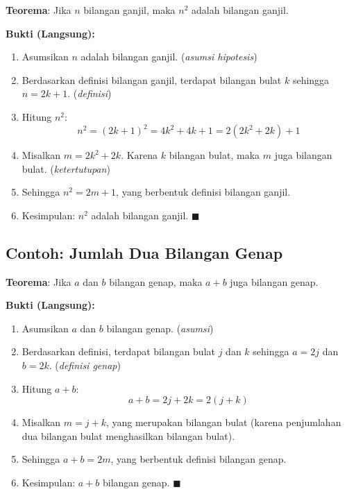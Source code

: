 \begin{contoh}
\textbf{Teorema}: Jika $n$ bilangan ganjil, maka $n^2$ adalah bilangan ganjil.

\textbf{Bukti (Langsung):}
\begin{enumerate}
    \item Asumsikan $n$ adalah bilangan ganjil. \hfill (\textit{asumsi hipotesis})
    \item Berdasarkan definisi bilangan ganjil, terdapat bilangan bulat $k$ sehingga $n = 2k + 1$. \hfill (\textit{definisi})
    \item Hitung $n^2$:
    \[ n^2 = (2k+1)^2 = 4k^2 + 4k + 1 = 2(2k^2 + 2k) + 1 \]
    \item Misalkan $m = 2k^2 + 2k$. Karena $k$ bilangan bulat, maka $m$ juga bilangan bulat. \hfill (\textit{ketertutupan})
    \item Sehingga $n^2 = 2m + 1$, yang berbentuk definisi bilangan ganjil.
    \item Kesimpulan: $n^2$ adalah bilangan ganjil. $\blacksquare$
\end{enumerate}
\end{contoh}

\subsection{Contoh: Jumlah Dua Bilangan Genap}

\begin{contoh}
\textbf{Teorema}: Jika $a$ dan $b$ bilangan genap, maka $a + b$ juga bilangan genap.

\textbf{Bukti (Langsung):}
\begin{enumerate}
    \item Asumsikan $a$ dan $b$ bilangan genap. \hfill (\textit{asumsi})
    \item Berdasarkan definisi, terdapat bilangan bulat $j$ dan $k$ sehingga $a = 2j$ dan $b = 2k$. \hfill (\textit{definisi genap})
    \item Hitung $a + b$:
    \[ a + b = 2j + 2k = 2(j + k) \]
    \item Misalkan $m = j + k$, yang merupakan bilangan bulat (karena penjumlahan dua bilangan bulat menghasilkan bilangan bulat).
    \item Sehingga $a + b = 2m$, yang berbentuk definisi bilangan genap.
    \item Kesimpulan: $a + b$ bilangan genap. $\blacksquare$
\end{enumerate}
\end{contoh}

